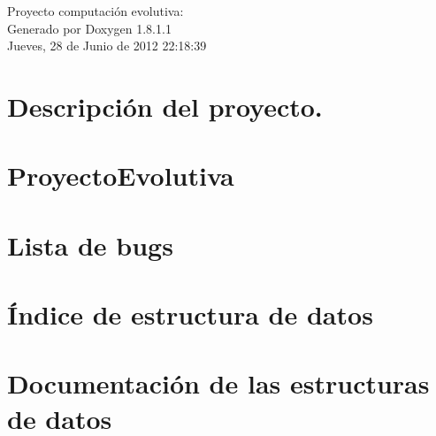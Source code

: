 \documentclass{book}
\begin{document}
\hypersetup{pageanchor=false,citecolor=blue}
\begin{titlepage}
\vspace*{7cm}
\begin{center}
{\Large Proyecto computación evolutiva\-: }\\
\vspace*{1cm}
{\large Generado por Doxygen 1.8.1.1}\\
\vspace*{0.5cm}
{\small Jueves, 28 de Junio de 2012 22:18:39}\\
\end{center}
\end{titlepage}
\clearemptydoublepage
{}
\tableofcontents
\clearemptydoublepage
{}
\hypersetup{pageanchor=true,citecolor=blue}
\chapter{Descripción del proyecto.}
\label{index}\hypertarget{index}{}
\chapter{Proyecto\-Evolutiva}
\label{md_README}
\hypertarget{md_README}{}

\chapter{Lista de bugs}
\label{bug}
\hypertarget{bug}{}

\chapter{Índice de estructura de datos}

\chapter{Documentación de las estructuras de datos}








\printindex
\end{document}
